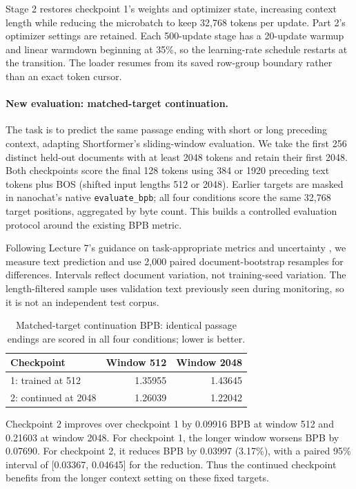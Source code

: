 \documentclass[11pt]{article}
\begin{document}
Stage 2 restores checkpoint 1's weights and optimizer state, increasing context
length while reducing the microbatch to keep 32,768 tokens per update.
Part 2's optimizer settings are retained. Each 500-update stage has a
20-update warmup and linear warmdown beginning at 35\%, so the learning-rate
schedule restarts at the transition. The loader resumes from its saved
row-group boundary rather than an exact token cursor.

\paragraph{New evaluation: matched-target continuation.}
The task is to predict the same passage ending with short or long preceding
context, adapting Shortformer's sliding-window evaluation\cite{p4-shortformer}.
We take the first 256 distinct held-out documents with at least 2048 tokens
and retain their first 2048. Both checkpoints score the final 128 tokens
using 384 or 1920 preceding text tokens plus BOS (shifted input lengths
512 or 2048). Earlier targets are masked in nanochat's native
\texttt{evaluate\_bpb}; all four conditions score the same 32,768 target
positions, aggregated by byte count. This builds a controlled evaluation
protocol around the existing BPB metric.

Following Lecture 7's guidance on task-appropriate metrics and uncertainty
\cite{p4-lecture7}, we measure text prediction and use 2,000 paired
document-bootstrap resamples for differences\cite{p4-statistical}.
Intervals reflect document variation, not training-seed variation. The
length-filtered sample uses validation text previously seen during monitoring,
so it is not an independent test corpus.

\begin{table}[htbp]
\centering
\begin{tabular}{lrr}
\hline
Checkpoint & Window 512 & Window 2048 \\
\hline
1: trained at 512 & 1.35955 & 1.43645 \\
2: continued at 2048 & 1.26039 & 1.22042 \\
\hline
\end{tabular}
\caption{Matched-target continuation BPB: identical passage endings are scored
in all four conditions; lower is better.}
\label{tab:p4-continuation}
\end{table}

Checkpoint 2 improves over checkpoint 1 by 0.09916 BPB at window 512 and
0.21603 at window 2048. For checkpoint 1, the longer window worsens BPB by
0.07690. For checkpoint 2, it reduces BPB by 0.03997 (3.17\%), with a paired
95\% interval of [0.03367, 0.04645] for the reduction. Thus the continued
checkpoint benefits from the longer context setting on these fixed targets.
\end{document}
